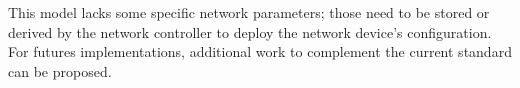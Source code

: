 \documentclass[10pt, conference]{IEEEtran}
\begin{document}
This model lacks some specific network parameters; those need to be stored or derived by the network controller to deploy the network device's configuration. For futures implementations, additional work to complement the current standard can be proposed.  






\end{document}

